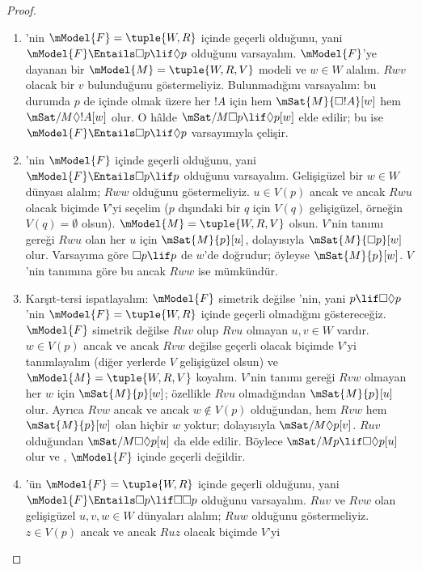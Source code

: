 \documentclass[../../../include/open-logic-section]{subfiles}
\begin{document}
\begin{proof}
  \begin{enumerate}
  \item {}'nin $\mModel{F}=\tuple{W,R}$ içinde geçerli olduğunu, yani
    $\mModel{F}\Entails\Box p\lif\Diamond p$ olduğunu varsayalım.
    $\mModel{F}$'ye dayanan bir $\mModel{M}=\tuple{W,R,V}$ modeli ve
    $w\in W$ alalım. $Rwv$ olacak bir $v$ bulunduğunu göstermeliyiz.
    Bulunmadığını varsayalım: bu durumda $p$ de içinde olmak üzere her $!A$
    için hem $\mSat{M}{\Box !A}[w]$ hem $\mSat/{M}{\Diamond !A}[w]$ olur.
    O hâlde $\mSat/{M}{\Box p\lif\Diamond p}[w]$ elde edilir; bu ise
    $\mModel{F}\Entails\Box p\lif\Diamond p$ varsayımıyla çelişir.
  \item {}'nin $\mModel{F}$ içinde geçerli olduğunu, yani
    $\mModel{F}\Entails\Box p\lif p$ olduğunu varsayalım. Gelişigüzel bir
    $w\in W$ dünyası alalım; $Rww$ olduğunu göstermeliyiz. $u\in V(p)$
    ancak ve ancak $Rwu$ olacak biçimde $V$'yi seçelim ($p$ dışındaki bir
    $q$ için $V(q)$ gelişigüzel, örneğin $V(q)=\emptyset$ olsun).
    $\mModel{M}=\tuple{W,R,V}$ olsun. $V$'nin tanımı gereği $Rwu$ olan her
    $u$ için $\mSat{M}{p}[u]$, dolayısıyla $\mSat{M}{\Box p}[w]$ olur.
    Varsayıma göre $\Box p\lif p$ de $w$'de doğrudur; öyleyse
    $\mSat{M}{p}[w]$. $V$'nin tanımına göre bu ancak $Rww$ ise mümkündür.
  \item Karşıt-tersi ispatlayalım: $\mModel{F}$ simetrik değilse 'nin,
    yani $p\lif\Box\Diamond p$'nin
    $\mModel{F}=\tuple{W,R}$ içinde geçerli olmadığını göstereceğiz.
    $\mModel{F}$ simetrik değilse $Ruv$ olup $Rvu$ olmayan $u,v\in W$
    vardır. $w\in V(p)$ ancak ve ancak $Rvw$ değilse geçerli olacak biçimde
    $V$'yi tanımlayalım (diğer yerlerde $V$ gelişigüzel olsun) ve
    $\mModel{M}=\tuple{W,R,V}$ koyalım. $V$'nin tanımı gereği $Rvw$
    olmayan her $w$ için $\mSat{M}{p}[w]$; özellikle $Rvu$ olmadığından
    $\mSat{M}{p}[u]$ olur. Ayrıca $Rvw$ ancak ve ancak $w\notin V(p)$
    olduğundan, hem $Rvw$ hem $\mSat{M}{p}[w]$ olan hiçbir $w$ yoktur;
    dolayısıyla $\mSat/{M}{\Diamond p}[v]$. $Ruv$ olduğundan
    $\mSat/{M}{\Box\Diamond p}[u]$ da elde edilir. Böylece
    $\mSat/{M}{p\lif\Box\Diamond p}[u]$ olur ve , $\mModel{F}$
    içinde geçerli değildir.
  \item {}'ün $\mModel{F}=\tuple{W,R}$ içinde geçerli olduğunu, yani
    $\mModel{F}\Entails\Box p\lif\Box\Box p$ olduğunu varsayalım. $Ruv$ ve
    $Rvw$ olan gelişigüzel $u,v,w\in W$ dünyaları alalım; $Ruw$ olduğunu
    göstermeliyiz. $z\in V(p)$ ancak ve ancak $Ruz$ olacak biçimde $V$'yi

\end{enumerate}
\end{proof}
\end{document}
